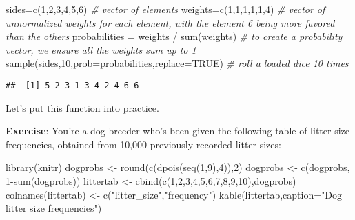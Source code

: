\documentclass[
]{book}
\newenvironment{Shaded}{\begin{snugshade}}{\end{snugshade}}
\newcommand{\AttributeTok}[1]{\textcolor[rgb]{0.77,0.63,0.00}{#1}}
\newcommand{\CommentTok}[1]{\textcolor[rgb]{0.56,0.35,0.01}{\textit{#1}}}
\newcommand{\ConstantTok}[1]{\textcolor[rgb]{0.00,0.00,0.00}{#1}}
\newcommand{\DecValTok}[1]{\textcolor[rgb]{0.00,0.00,0.81}{#1}}
\newcommand{\FunctionTok}[1]{\textcolor[rgb]{0.00,0.00,0.00}{#1}}
\newcommand{\NormalTok}[1]{#1}
\newcommand{\OtherTok}[1]{\textcolor[rgb]{0.56,0.35,0.01}{#1}}
\newcommand{\SpecialCharTok}[1]{\textcolor[rgb]{0.00,0.00,0.00}{#1}}
\newcommand{\StringTok}[1]{\textcolor[rgb]{0.31,0.60,0.02}{#1}}
\begin{document}
\begin{Shaded}
\begin{Highlighting}[]
\NormalTok{sides}\OtherTok{=}\FunctionTok{c}\NormalTok{(}\DecValTok{1}\NormalTok{,}\DecValTok{2}\NormalTok{,}\DecValTok{3}\NormalTok{,}\DecValTok{4}\NormalTok{,}\DecValTok{5}\NormalTok{,}\DecValTok{6}\NormalTok{) }\CommentTok{\# vector of elements}
\NormalTok{weights}\OtherTok{=}\FunctionTok{c}\NormalTok{(}\DecValTok{1}\NormalTok{,}\DecValTok{1}\NormalTok{,}\DecValTok{1}\NormalTok{,}\DecValTok{1}\NormalTok{,}\DecValTok{1}\NormalTok{,}\DecValTok{4}\NormalTok{) }\CommentTok{\# vector of unnormalized weights for each element, with the element \textquotesingle{}6\textquotesingle{} being more favored than the others}
\NormalTok{probabilities }\OtherTok{=}\NormalTok{ weights }\SpecialCharTok{/} \FunctionTok{sum}\NormalTok{(weights) }\CommentTok{\# to create a probability vector, we ensure all the weights sum up to 1}
\FunctionTok{sample}\NormalTok{(sides,}\DecValTok{10}\NormalTok{,}\AttributeTok{prob=}\NormalTok{probabilities,}\AttributeTok{replace=}\ConstantTok{TRUE}\NormalTok{) }\CommentTok{\# roll a loaded dice 10 times}
\end{Highlighting}
\end{Shaded}

\begin{verbatim}
##  [1] 5 2 3 1 3 4 2 4 6 6
\end{verbatim}

Let's put this function into practice.

\textbf{Exercise}: You're a dog breeder who's been given the following table of litter size frequencies, obtained from 10,000 previously recorded litter sizes:

\begin{Shaded}
\begin{Highlighting}[]
\FunctionTok{library}\NormalTok{(knitr)}
\NormalTok{dogprobs }\OtherTok{\textless{}{-}} \FunctionTok{round}\NormalTok{(}\FunctionTok{c}\NormalTok{(}\FunctionTok{dpois}\NormalTok{(}\FunctionTok{seq}\NormalTok{(}\DecValTok{1}\NormalTok{,}\DecValTok{9}\NormalTok{),}\DecValTok{4}\NormalTok{)),}\DecValTok{2}\NormalTok{)}
\NormalTok{dogprobs }\OtherTok{\textless{}{-}} \FunctionTok{c}\NormalTok{(dogprobs, }\DecValTok{1}\SpecialCharTok{{-}}\FunctionTok{sum}\NormalTok{(dogprobs))}
\NormalTok{littertab }\OtherTok{\textless{}{-}} \FunctionTok{cbind}\NormalTok{(}\FunctionTok{c}\NormalTok{(}\DecValTok{1}\NormalTok{,}\DecValTok{2}\NormalTok{,}\DecValTok{3}\NormalTok{,}\DecValTok{4}\NormalTok{,}\DecValTok{5}\NormalTok{,}\DecValTok{6}\NormalTok{,}\DecValTok{7}\NormalTok{,}\DecValTok{8}\NormalTok{,}\DecValTok{9}\NormalTok{,}\DecValTok{10}\NormalTok{),dogprobs)}
\FunctionTok{colnames}\NormalTok{(littertab) }\OtherTok{\textless{}{-}} \FunctionTok{c}\NormalTok{(}\StringTok{"litter\_size"}\NormalTok{,}\StringTok{"frequency"}\NormalTok{)}
\FunctionTok{kable}\NormalTok{(littertab,}\AttributeTok{caption=}\StringTok{"Dog litter size frequencies"}\NormalTok{)}
\end{Highlighting}
\end{Shaded}
\end{document}
